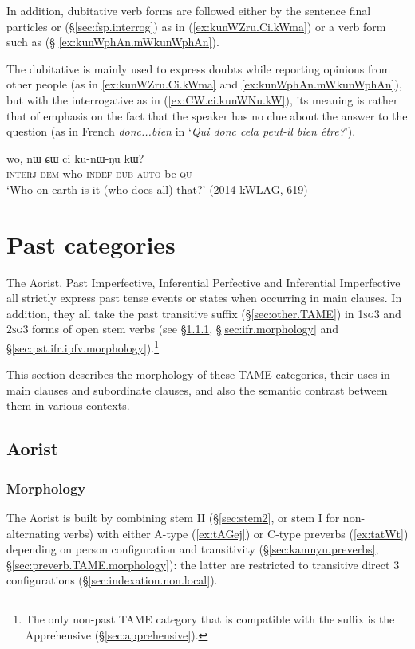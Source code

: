 In addition, dubitative verb forms are followed either by the sentence final particles  or  (§\ref{sec:fsp.interrog}) as in (\ref{ex:kunWZru.Ci.kWma}) or a verb form such as  (§ \ref{ex:kunWphAn.mWkunWphAn}).

The dubitative is mainly used to express doubts while reporting opinions from other people (as in \ref{ex:kunWZru.Ci.kWma} and \ref{ex:kunWphAn.mWkunWphAn}), but with the interrogative  as in (\ref{ex:CW.ci.kunWNu.kW}), its meaning is rather that of emphasis on the fact that the speaker has no clue about the answer to the question (as in French \textit{donc...bien} in `\textit{Qui donc cela peut-il bien être?}').

\begin{exe}
\ex \label{ex:CW.ci.kunWNu.kW}
 \gll wo, nɯ ɕɯ ci ku-nɯ-ŋu kɯ?  \\
 \textsc{interj} \textsc{dem} who \textsc{indef} \textsc{dub}-\textsc{auto}-be \textsc{qu} \\
\glt `Who on earth is it (who does all) that?' (2014-kWLAG, 619)
 \end{exe}
 
\section{Past categories}   \label{sec:TAME.pst}
The Aorist, Past Imperfective, Inferential Perfective and Inferential Imperfective all strictly express past tense events or states when occurring in main clauses. In addition, they all take the past transitive  suffix (§\ref{sec:other.TAME}) in \textsc{1sg}\fl{}3 and \textsc{2sg}\fl{}3 forms of open stem verbs (see §\ref{sec:aor.morphology}, §\ref{sec:ifr.morphology} and §\ref{sec:pst.ifr.ipfv.morphology}).\footnote{The only non-past TAME category that is compatible with the  suffix is the Apprehensive (§\ref{sec:apprehensive}). }

This section describes the morphology of these TAME categories, their uses in main clauses and subordinate clauses, and also the semantic contrast between them in various contexts.


\subsection{Aorist}    \label{sec:aor}

\subsubsection{Morphology} \label{sec:aor.morphology}
The Aorist is built by combining stem II (§\ref{sec:stem2}, or stem I for non-alternating verbs) with either A-type (\ref{ex:tAGej}) or C-type preverbs (\ref{ex:tatWt}) depending on person configuration and transitivity (§\ref{sec:kamnyu.preverbs}, §\ref{sec:preverb.TAME.morphology}): the latter are restricted to transitive direct 3\flobv{} configurations (§\ref{sec:indexation.non.local}).

